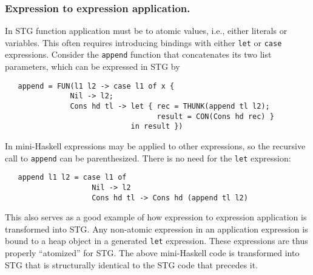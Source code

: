 \documentclass{llncs}
\begin{document}
\begin{comment} Trimming Mini-Haskell to fit page limit
The inclusion of the layout rule may seem insignificant, but it
allows users to produce code that is visually similar to Haskell code.
This makes it easier to read and write for any Haskell programmer who relies
on layout to delineate context, presumably the vast majority.  It also allows
for the use of Haskell programming environments that support ``smart''
indentation, e.g., \emph{haskell-mode} for Emacs~\cite{haskellmode}.
\end{comment}




\subsubsection{Expression to expression application.}

In STG function application must be to atomic values, i.e., either literals or
variables.  This often requires introducing bindings with either \texttt{let} or
\texttt{case} expressions.  Consider the \texttt{append} function that
concatenates its two list parameters, which can be expressed in STG by
{\footnotesize
\begin{verbatim}
   append = FUN(l1 l2 -> case l1 of x {
               Nil -> l2; 
               Cons hd tl -> let { rec = THUNK(append tl l2);
                                   result = CON(Cons hd rec) }
                             in result })
\end{verbatim}}
\noindent In mini-Haskell expressions may be applied to other expressions, so the
recursive call to \texttt{append} can be parenthesized. There is no need for the
\texttt{let} expression:
{\footnotesize
\begin{verbatim}
   append l1 l2 = case l1 of
                    Nil -> l2
                    Cons hd tl -> Cons hd (append tl l2)
\end{verbatim}}
\noindent This also serves as a good example of how expression to expression application is
transformed into STG.  Any non-atomic expression in an application expression is
bound to a heap object in a generated \texttt{let} expression.  These
expressions are thus properly ``atomized'' for STG.  The above mini-Haskell code
is transformed into STG that is structurally identical to the STG code that
precedes it.
\end{document}
